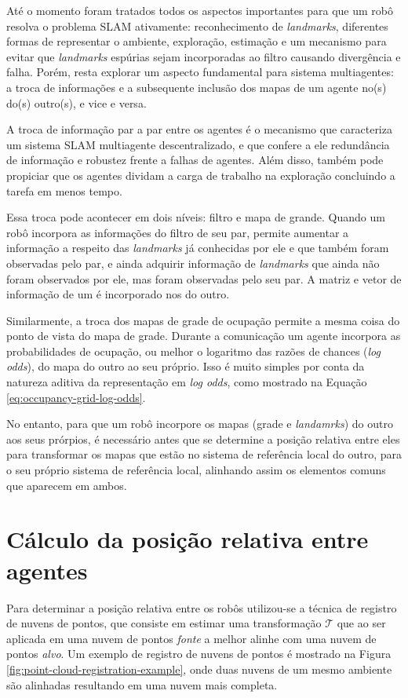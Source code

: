 Até o momento foram tratados todos os aspectos importantes para que 
um robô resolva o problema SLAM ativamente: reconhecimento de 
\textit{landmarks}, diferentes formas de representar o ambiente, 
exploração, estimação e um mecanismo para evitar que \textit{landmarks} 
espúrias sejam incorporadas ao filtro causando divergência e falha. 
Porém, resta explorar um aspecto fundamental para sistema multiagentes: 
a troca de informações e a subsequente inclusão dos mapas de um agente 
no(s) do(s) outro(s), e vice e versa.

A troca de informação par a par entre os agentes é o mecanismo que 
caracteriza um sistema SLAM multiagente descentralizado, e que confere 
a ele redundância de informação e robustez frente a falhas de agentes. 
Além disso, também pode propiciar que os agentes dividam a carga de 
trabalho na exploração concluindo a tarefa em menos tempo.

Essa troca pode acontecer em dois níveis: filtro e mapa de grande. 
Quando um robô incorpora as informações do filtro de seu par, 
permite aumentar a informação a respeito das \textit{landmarks} já 
conhecidas por ele e que também foram observadas pelo par, e ainda 
adquirir informação de \textit{landmarks} que ainda não foram 
observados por ele, mas foram observadas pelo seu par. A matriz e vetor 
de informação de um é incorporado nos do outro.

Similarmente, a troca dos mapas de grade de ocupação permite a mesma 
coisa do ponto de vista do mapa de grade. Durante a comunicação um 
agente incorpora as probabilidades de ocupação, ou melhor o logaritmo 
das razões de chances (\textit{log odds}), do mapa do outro ao seu 
próprio. Isso é muito simples por conta da natureza aditiva da 
representação em \textit{log odds}, como mostrado na Equação \ref{eq:occupancy-grid-log-odds}.

No entanto, para que um robô incorpore os mapas (grade e \textit{landamrks}) do outro aos seus prórpios, é necessário antes que se determine a posição relativa entre eles para transformar os 
mapas que estão no sistema de referência local do outro, para o seu 
próprio sistema de referência local, alinhando assim os elementos comuns 
que aparecem em ambos.

\section{Cálculo da posição relativa entre agentes}

Para determinar a posição relativa entre os robôs utilizou-se a técnica 
de registro de nuvens de pontos, que consiste em estimar uma 
transformação $\mathcal{T}$ que ao ser aplicada em uma nuvem de pontos 
\emph{fonte} a melhor alinhe com uma nuvem de pontos \emph{alvo}. Um 
exemplo de registro de nuvens de pontos é mostrado na Figura 
\ref{fig:point-cloud-registration-example}, onde duas nuvens de um mesmo 
ambiente são alinhadas resultando em uma nuvem mais completa.

